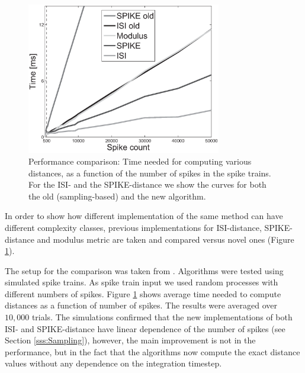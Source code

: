 \documentclass[10pt,twocolumn]{elsart5p}
\begin{document}
%
%
\begin{figure}
    \includegraphics[width=85mm]{Performance_Comparison.eps}
    \caption{\abb\label{fig:Fig5-Performance-Comparison} Performance comparison: Time needed for computing various distances, as a function of the number of spikes in the spike trains. For the ISI- and the SPIKE-distance we show the curves for both the old (sampling-based) and the new algorithm.}
\end{figure}
%
%

In order to show how different implementation of the same method can have different complexity classes, previous implementations for ISI-distance, SPIKE-distance and modulus metric are taken and compared versus novel ones (Figure \ref{fig:Fig5-Performance-Comparison}).

The setup for the comparison was taken from \cite{Rusu14}. Algorithms were tested using simulated spike trains. As spike train input we used random processes with different numbers of spikes. Figure \ref{fig:Fig5-Performance-Comparison} shows average time needed to compute distances as a function of number of spikes. The results were averaged over $10,000$ trials. The simulations confirmed that the new implementations of both ISI- and SPIKE-distance have linear dependence of the number of spikes (see Section \ref{sss:Sampling}), however, the main improvement is not in the performance, but in the fact that the algorithms now compute the exact distance values without any dependence on the integration timestep.
\end{document}
